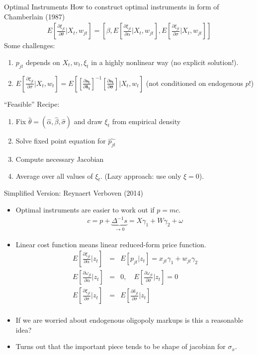 \begin{frame}{Optimal Instruments}
How to construct optimal instruments in form of Chamberlain (1987)
\begin{eqnarray*}
E\left[\frac{\partial \xi_{jt}}{\partial \theta} | X_t, w_{jt} \right] = \left[\beta, E\left[\frac{\partial \xi_{jt}}{\partial \alpha} | X_t, w_{jt} \right] , E\left[\frac{\partial \xi_{jt}}{\partial \sigma} | X_t, w_{jt} \right] \right]
\end{eqnarray*}
Some challenges:
\begin{enumerate}
\item $p_{jt}$ depends on $X_{t}, w_{t}, \xi_{t}$ in a highly nonlinear way (no explicit solution!).
\item $E[\frac{\partial \xi_{jt}}{\partial \sigma} | X_t, w_{t} ] =E[[\frac{\partial \symbf{s_t}}{\partial \symbf{\delta_t}}]^{-1} [\frac{\partial \symbf{s_t}}{\partial \symbf{\sigma}}] | X_t, w_{t} ]$  (not conditioned on endogenous $p$!)
\end{enumerate}
``Feasible'' Recipe:
\begin{enumerate}
\item Fix $\hat{\theta}=(\hat{\alpha},\hat{\beta},\hat{\sigma})$ and draw $\xi_t$ from empirical density
\item Solve fixed point equation for $\hat{p_{jt}}$
\item Compute necessary Jacobian
\item Average over all values of $\xi_t$. (Lazy approach: use only $\xi =0$).
\end{enumerate}
\end{frame}


\begin{frame}{Simplified Version: Reynaert Verboven (2014)}
\begin{itemize}
\footnotesize
\item Optimal instruments are easier to work out if $p = mc$.
\begin{eqnarray*}
c = p  + \underbrace{\Delta^{-1} s}_{\rightarrow 0}  = X \gamma_1 + W \gamma_2 + \omega
\end{eqnarray*}
\item Linear cost function means linear reduced-form price function.
\begin{eqnarray*}
E\left[ \frac{\partial \xi_{jt} }{\partial \alpha} | z_t \right] &=& E[p_{jt} | z_t] = x_{jt} \gamma_1 + w_{jt} \gamma_2\\
E\left[ \frac{\partial \omega_{jt} }{\partial \alpha} | z_t \right] &=& 0 , \quad E\left[ \frac{\partial \omega_{jt} }{\partial \sigma} | z_t \right] = 0\\
E\left[ \frac{\partial \xi_{jt} }{\partial \sigma} | z_t \right] &=&E\left[ \frac{\partial \delta_{jt} }{\partial \sigma} | z_t \right]\\
\end{eqnarray*}
\item If we are worried about endogenous oligopoly markups is this a reasonable idea?
\item Turns out that the important piece tends to be \alert{shape} of jacobian for $\sigma_x$.
\end{itemize}
\end{frame}

